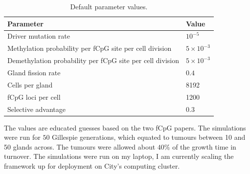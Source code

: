 \begin{table}[ht]
\centering
\begin{tabular}{|l|l|}
\hline
Parameter & Value \\
\hline
    Driver mutation rate & $10^{-5}$   \\
    Methylation probability per fCpG site per cell division & $5\times10^{-3}$ \\
    Demethylation probability per fCpG site per cell division & $5\times10^{-3}$ \\
    Gland fission rate & $0.4$  \\
    Cells per gland & 8192 \\
    fCpG loci per cell & 1200 \\
    Selective advantage & $0.3$ \\
\hline
\end{tabular}
\caption{Default parameter values.}\label{tab:parameters}
\end{table}
The values are educated guesses based on the two fCpG papers. The simulations were run for $50$ Gillespie generations, which equated to tumours between 10 and 50 glands across. The tumours were allowed about $40\%$ of the growth time in turnover. The simulations were run on my laptop, I am currently scaling the framework up for deployment on City's computing cluster.\par

